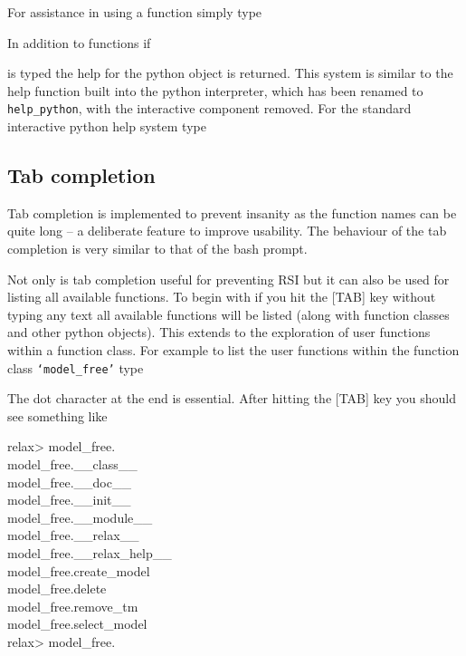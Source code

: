 For assistance in using a function simply type


In addition to functions if


is typed the help for the python object is returned.  This system is similar to the help function built into the python interpreter, which has been renamed to \texttt{help\_python}, with the interactive component removed.  For the standard interactive python help system type






\subsection{Tab completion}

Tab completion is implemented to prevent insanity as the function names can be quite long -- a deliberate feature to improve usability.  The behaviour of the tab completion is very similar to that of the bash prompt.

Not only is tab completion useful for preventing RSI but it can also be used for listing all available functions.  To begin with if you hit the [TAB] key without typing any text all available functions will be listed (along with function classes and other python objects).  This extends to the exploration of user functions within a function class.  For example to list the user functions within the function class \texttt{`model\_free'} type


The dot character at the end is essential.  After hitting the [TAB] key you should see something like

\begin{exampleenv}
relax> model\_free. \\
model\_free.\_\_class\_\_ \\
model\_free.\_\_doc\_\_ \\
model\_free.\_\_init\_\_ \\
model\_free.\_\_module\_\_ \\
model\_free.\_\_relax\_\_ \\
model\_free.\_\_relax\_help\_\_ \\
model\_free.create\_model \\
model\_free.delete \\
model\_free.remove\_tm \\
model\_free.select\_model \\
relax> model\_free.
\end{exampleenv}

